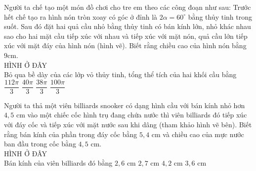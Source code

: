 \begin{ex}
	Người ta chế tạo một món đồ chơi cho tre em theo các công đoạn như sau: Trước hết chế tạo ra hình nón tròn xoay có góc ở đỉnh là $2\alpha=60^\circ $ bằng thủy tinh trong suốt. Sau đó đặt hai quả cầu nhỏ bằng thủy tinh có bán kính lớn, nhỏ khác nhau sao cho hai mặt cầu tiếp xúc với nhau và tiếp xúc với mặt nón, quả cầu lớn tiếp xúc với mặt đáy của hình nón (hình vẽ). Biết rằng chiều cao của hình nón bằng $9\mathrm{cm}$.\\
	{\color{red}HÌNH Ở ĐÂY}\\
	Bỏ qua bề dày của các lớp vỏ thủy tinh, tổng thể tích của hai khối cầu bằng
	\choice
	{\True $\dfrac{112\pi}{3}$}
	{$\dfrac{40\pi}{3}$}
	{$\dfrac{38\pi}{3}$}
	{$\dfrac{100\pi}{3}$}
\end{ex}
\begin{ex}
	Người ta thả một viên billiards snooker có dạng hình cầu với bán kính nhỏ hơn $4,5$ $\mathrm{cm}$ vào một chiếc cốc hình trụ đang chứa nước thì viên billiards đó tiếp xúc với đáy cốc và tiếp xúc với mặt nước sau khi dâng (tham khảo hình vẽ bên). Biết rằng bán kính của phần trong đáy cốc bằng $5,4$ $\mathrm{cm}$ và chiều cao của mực nước ban đầu trong cốc bằng $4,5$ $\mathrm{cm}$.\\
	{\color{red}HÌNH Ở ĐÂY}\\
	Bán kính của viên billiards đó bằng
	\choice
	{$2,6$ $\mathrm{cm}$}
	{\True $2,7$ $\mathrm{cm}$}
	{$4,2$ $\mathrm{cm}$}
	{$3,6$ $\mathrm{cm}$}
\end{ex}
